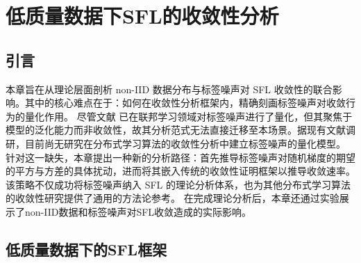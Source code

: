 
\chapter{低质量数据下SFL的收敛性分析}
\section{引言}
本章旨在从理论层面剖析 non-IID 数据分布与标签噪声对 SFL 收敛性的联合影响。其中的核心难点在于：如何在收敛性分析框架内，精确刻画标签噪声对收敛行为的量化作用。
尽管文献 \cite{ke2023impact} 已在联邦学习领域对标签噪声进行了量化，但其聚焦于模型的泛化能力而非收敛性，故其分析范式无法直接迁移至本场景。据现有文献调研，目前尚无研究在分布式学习算法的收敛性分析中建立标签噪声的量化模型。
针对这一缺失，本章提出一种新的分析路径：首先推导标签噪声对随机梯度的期望的平方与方差的具体扰动，进而将其嵌入传统的收敛性证明框架以推导收敛速率。该策略不仅成功将标签噪声纳入 SFL 的理论分析体系，也为其他分布式学习算法的收敛性研究提供了通用的方法论参考。
在完成理论分析后，本章还通过实验展示了non-IID数据和标签噪声对SFL收敛造成的实际影响。
\section{低质量数据下的SFL框架}



